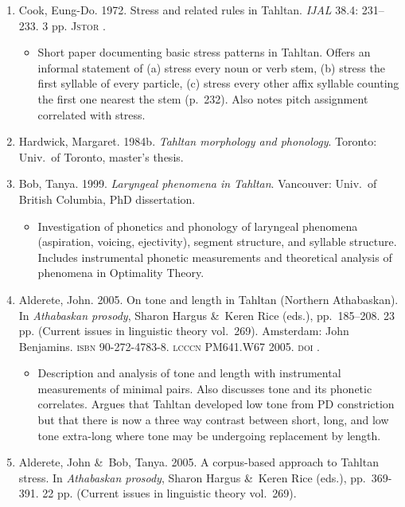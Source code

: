 \documentclass[12pt,letterpaper,oneside,article]{memoir}
\begin{document}
\begin{enumerate}
\item	Cook, Eung-Do.
	1972.
	Stress and related rules in Tahltan.
	\textit{IJAL} 38.4: 231–233.
	3 pp.
	\textsc{Jstor} .
	\begin{itemize}
	\item	Short paper documenting basic stress patterns in Tahltan.
		Offers an informal statement of
		(a) stress every noun or verb stem,
		(b) stress the first syllable of every particle,
		(c) stress every other affix syllable counting the first one
			nearest the stem (p.\ 232).
		Also notes pitch assignment correlated with stress.
	\end{itemize}
\item	Hardwick, Margaret.
	1984b.
	\textit{Tahltan morphology and phonology}.
	Toronto: Univ.\ of Toronto, master’s thesis.
\item	Bob, Tanya.
	1999.
	\textit{Laryngeal phenomena in Tahltan}.
	Vancouver: Univ.\ of British Columbia, PhD dissertation.
	\begin{itemize}
	\item	Investigation of phonetics and phonology of laryngeal phenomena
		(aspiration, voicing, ejectivity), segment structure, and syllable structure.
		Includes instrumental phonetic measurements and theoretical analysis
		of phenomena in Optimality Theory.
	\end{itemize}
\item	Alderete, John.
	2005.
	On tone and length in Tahltan (Northern Athabaskan).
	In \textit{Athabaskan prosody}, Sharon Hargus \&\ Keren Rice (eds.),
	pp.\ 185–208.
	23 pp.
	(Current issues in linguistic theory vol.\ 269).
	Amsterdam: John Benjamins.
	\textsc{isbn} 90-272-4783-8.
	\textsc{lcccn} PM641.W67 2005.
	\textsc{doi} .
	\begin{itemize}
	\item	Description and analysis of tone and length with instrumental measurements
		of minimal pairs.
		Also discusses tone and its phonetic correlates.
		Argues that Tahltan developed low tone from PD constriction but that there
		is now a three way contrast between short, long, and low tone extra-long
		where tone may be undergoing replacement by length.
	\end{itemize}
\item	Alderete, John \&\ Bob, Tanya.
	2005.
	A corpus-based approach to Tahltan stress.
	In \textit{Athabaskan prosody}, Sharon Hargus \&\ Keren Rice (eds.),
	pp.\ 369-391.
	22 pp.
	(Current issues in linguistic theory vol.\ 269).

\end{enumerate}
\end{document}
